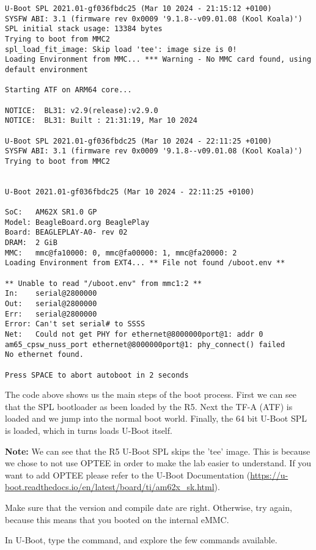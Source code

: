 \begin{verbatim}
U-Boot SPL 2021.01-gf036fbdc25 (Mar 10 2024 - 21:15:12 +0100)
SYSFW ABI: 3.1 (firmware rev 0x0009 '9.1.8--v09.01.08 (Kool Koala)')
SPL initial stack usage: 13384 bytes
Trying to boot from MMC2
spl_load_fit_image: Skip load 'tee': image size is 0!
Loading Environment from MMC... *** Warning - No MMC card found, using default environment

Starting ATF on ARM64 core...

NOTICE:  BL31: v2.9(release):v2.9.0
NOTICE:  BL31: Built : 21:31:19, Mar 10 2024

U-Boot SPL 2021.01-gf036fbdc25 (Mar 10 2024 - 22:11:25 +0100)
SYSFW ABI: 3.1 (firmware rev 0x0009 '9.1.8--v09.01.08 (Kool Koala)')
Trying to boot from MMC2


U-Boot 2021.01-gf036fbdc25 (Mar 10 2024 - 22:11:25 +0100)

SoC:   AM62X SR1.0 GP
Model: BeagleBoard.org BeaglePlay
Board: BEAGLEPLAY-A0- rev 02
DRAM:  2 GiB
MMC:   mmc@fa10000: 0, mmc@fa00000: 1, mmc@fa20000: 2
Loading Environment from EXT4... ** File not found /uboot.env **

** Unable to read "/uboot.env" from mmc1:2 **
In:    serial@2800000
Out:   serial@2800000
Err:   serial@2800000
Error: Can't set serial# to SSSS
Net:   Could not get PHY for ethernet@8000000port@1: addr 0
am65_cpsw_nuss_port ethernet@8000000port@1: phy_connect() failed
No ethernet found.

Press SPACE to abort autoboot in 2 seconds
\end{verbatim}

The code above shows us the main steps of the boot process. First we
can see that the SPL bootloader as been loaded by the R5. Next the
TF-A (ATF) is loaded and we jump into the normal boot world. Finally,
the 64 bit U-Boot SPL is loaded, which in turns loads U-Boot itself.

\textbf{Note:} We can see that the R5 U-Boot SPL skips the 'tee'
image. This is because we chose to not use OPTEE in order
to make the lab easier to understand. If you want to add OPTEE please refer
to the U-Boot Documentation
(\url{https://u-boot.readthedocs.io/en/latest/board/ti/am62x_sk.html}).

Make sure that the version and compile date are right. Otherwise, try
again, because this means that you booted on the internal eMMC.

In U-Boot, type the  command, and explore the few commands
available.

